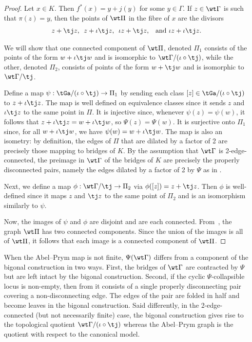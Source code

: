  \begin{proof}
 Let $x\in K$. Then $f^*(x) = y + j(y)$ for some $y\in\Gamma$. If $z\in\wt\Gamma$ is such that $\pi(z) = y$, then the points of $\wt\Pi$ in the fibre of $x$ are the divisors
 \[
 z + \tj z,\,\,\, z+\iota\tj z,\,\,\, \iota z + \tj z,\,\,\, \text{ and } \iota z + \iota\tj z.
 \]

We will show that one connected component of $\wt \Pi$, denoted $\Pi_1$  consists of the points of the form $w + \iota\tj w$ and is isomorphic to $\wt\Gamma/(\iota\circ\tj)$, while the other, denoted $\Pi_2$,  consists of  points of the form $w + \tj w$ and is isomorphic to $\wt\Gamma/\tj$. 

Define a map  $\psi:\tGa/(\iota\circ\tj)\to \Pi_1$ by sending each class $[z]\in \tGa/(\iota\circ\tj)$ to $z + \iota\tj z$. The map is well defined on equivalence classes since it sends $z$ and $\iota\tj z$ to the same point in $\Pi$. It is injective since, whenever $\psi(z) = \psi(w)$, it follows that $z + \iota\tj z = w + \iota\tj w$, so $\Psi(z) = \Psi(w)$. It is surjective onto $\Pi_1$ since, for all $w+\iota\tj w$, we have $\psi(w) = w+\iota\tj w$. The map is also an isometry: by definition, the edges of $\Pi$ that are dilated by a factor of 2 are precisely those mapping to bridges of $K$. By the assumption that $\wt\Gamma$ is 2-edge-connected, the preimage in $\wt\Gamma$ of the bridges of $K$ are precisely the properly disconnected pairs, namely the edges dilated by a factor of 2 by $\Psi$ as in . 

Next, we define a map $\phi:\wt\Gamma/\tj\to \Pi_2$ via $\phi([z]) = z + \tj z$. Then $\phi$ is well-defined since it maps $z$ and $\tj z$ to the same point of $\Pi_2$ and is an isomorphism similarly to $\psi$. 

Now, the images of $\psi$ and $\phi$ are disjoint and are each connected. From~\cite[Proposition 2.5]{RZ_ngonal}, the graph $\wt \Pi$ has two connected components. 
Since the union of the images is all of $\wt \Pi$, it follows that each image is a connected component of $\wt \Pi$.  
 \end{proof}


\begin{rema}\label{rem:bigonalForNonFiniteAP}
When the Abel--Prym map is not finite, $\Psi(\wt\Gamma)$ differs from a component of the bigonal construction in two ways. First,  the bridges of   $\wt\Gamma$ are contracted by $\Psi$ but are left intact by the bigonal construction.  Second, if the cyclic $\Psi$-collapsible locus is non-empty, then from  it consists of a single properly disconnecting pair covering a non-disconnecting edge. The edges of the pair are  folded in half and become leaves in the bigonal construction. Said differently, in the 2-edge-connected (but not necessarily finite) case, the bigonal construction gives rise to the topological quotient $\wt\Gamma/(\iota\circ\tj)$ whereas the Abel--Prym graph is the quotient with respect to the canonical model. 
\end{rema}

